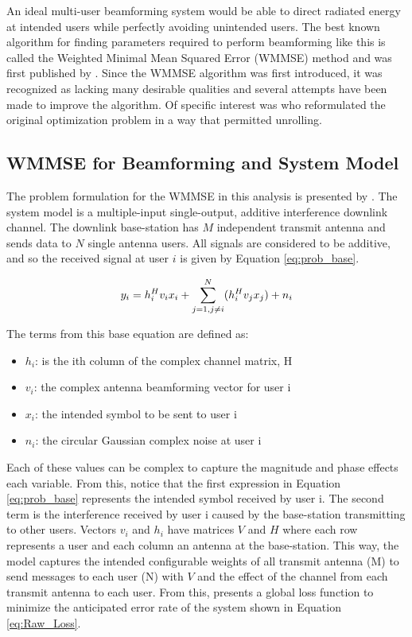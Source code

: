 \documentclass[journal]{IEEEtran}
\begin{document}
An ideal multi-user beamforming system would be able to direct radiated energy at intended users while perfectly avoiding unintended users. The best known algorithm for finding parameters required to perform beamforming like this is called the Weighted Minimal Mean Squared Error (WMMSE) method and was first published by \cite{WMMSE}. Since the WMMSE algorithm was first introduced, it was recognized as lacking many desirable qualities and several attempts have been made to improve the algorithm. Of specific interest was \cite{Deep_Unfolding} who reformulated the original optimization problem in a way that permitted unrolling.

\subsection{WMMSE for Beamforming and System Model}
The problem formulation for the WMMSE in this analysis is presented by \cite{Deep_Unfolding}. The system model is a multiple-input single-output, additive interference downlink channel. The downlink base-station has $M$ independent transmit antenna and sends data to $N$ single antenna users. All signals are considered to be additive, and so the received signal at user $i$ is given by Equation \ref{eq:prob_base}.

\begin{equation}
y_i = \boldmath{h^H_i}\boldmath{v_i}x_i + \sum^{N}_{j=1, j\neq i}(\boldmath{h^H_i}\boldmath{v_j}x_j) + n_i
\label{eq:prob_base}
\end{equation}

The terms from this base equation are defined as:

\begin{itemize}
\item{$h_i$: is the ith column of the complex channel matrix, H}
\item{$v_i$: the complex antenna beamforming vector for user i}
\item{$x_i$: the intended symbol to be sent to user i}
\item{$n_i$: the circular Gaussian complex noise at user i}
\end{itemize}

Each of these values can be complex to capture the magnitude and phase effects each variable. From this, notice that the first expression in Equation \ref{eq:prob_base} represents the intended symbol received by user i. The second term is the interference received by user i caused by the base-station transmitting to other users. Vectors $v_i$ and $h_i$ have matrices $V$ and $H$ where each row represents a user and each column an antenna at the base-station. This way, the model captures the intended configurable weights of all transmit antenna (M) to send messages to each user (N) with $V$ and the effect of the channel from each transmit antenna to each user. From this, \cite{Deep_Unfolding} presents a global loss function to minimize the anticipated error rate of the system shown in Equation \ref{eq:Raw_Loss}.
\end{document}
